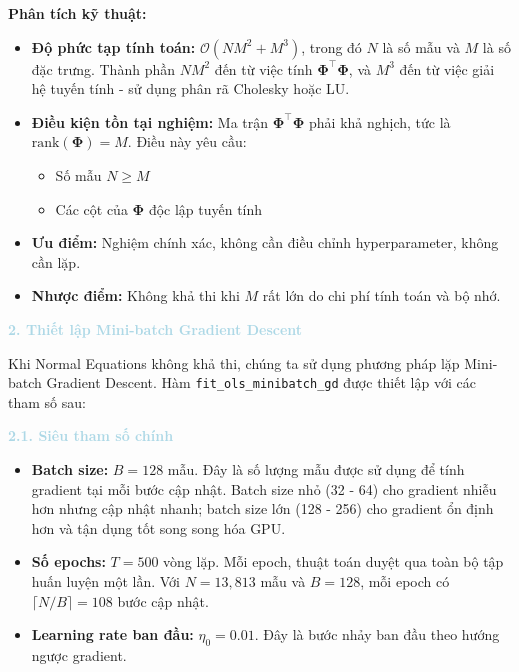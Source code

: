 \textbf{Phân tích kỹ thuật:}
\begin{itemize} [labelsep=10pt, leftmargin=2cm]
    \item \textbf{Độ phức tạp tính toán:} $\mathcal{O}(NM^2 + M^3)$, trong đó $N$ là số mẫu và $M$ là số đặc trưng. Thành phần $NM^2$ đến từ việc tính $\mathbf{\Phi}^{\top}\mathbf{\Phi}$, và $M^3$ đến từ việc giải hệ tuyến tính - sử dụng phân rã Cholesky hoặc LU.
    
    \item \textbf{Điều kiện tồn tại nghiệm:} Ma trận $\mathbf{\Phi}^{\top}\mathbf{\Phi}$ phải khả nghịch, tức là $\text{rank}(\mathbf{\Phi}) = M$. Điều này yêu cầu:
    \begin{itemize}
        \item Số mẫu $N \geq M$ 
        \item Các cột của $\mathbf{\Phi}$ độc lập tuyến tính 
    \end{itemize}
    
    \item \textbf{Ưu điểm:} Nghiệm chính xác, không cần điều chỉnh hyperparameter, không cần lặp.
    
    \item \textbf{Nhược điểm:} Không khả thi khi $M$ rất lớn do chi phí tính toán và bộ nhớ.
\end{itemize}

\vspace{0.5em}
\noindent\textcolor{lightblue}{\textbf{2. Thiết lập Mini-batch Gradient Descent}}
\vspace{0.5em}

Khi Normal Equations không khả thi, chúng ta sử dụng phương pháp lặp Mini-batch Gradient Descent. Hàm \texttt{fit\_ols\_minibatch\_gd} được thiết lập với các tham số sau:

\noindent\textcolor{lightblue}{\textbf{2.1. Siêu tham số chính}}
\begin{itemize} [labelsep=10pt, leftmargin=2cm]
    \item \textbf{Batch size:} $B = 128$ mẫu. Đây là số lượng mẫu được sử dụng để tính gradient tại mỗi bước cập nhật. Batch size nhỏ (32 - 64) cho gradient nhiễu hơn nhưng cập nhật nhanh; batch size lớn (128 - 256) cho gradient ổn định hơn và tận dụng tốt song song hóa GPU.
    
    \item \textbf{Số epochs:} $T = 500$ vòng lặp. Mỗi epoch, thuật toán duyệt qua toàn bộ tập huấn luyện một lần. Với $N = 13{,}813$ mẫu và $B = 128$, mỗi epoch có $\lceil N/B \rceil = 108$ bước cập nhật.
    
    \item \textbf{Learning rate ban đầu:} $\eta_0 = 0.01$. Đây là bước nhảy ban đầu theo hướng ngược gradient.
\end{itemize}

